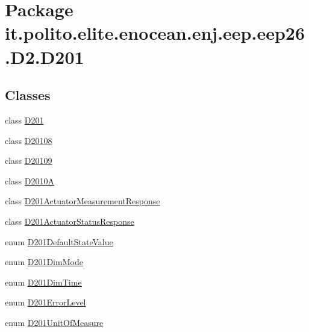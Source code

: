 \hypertarget{namespaceit_1_1polito_1_1elite_1_1enocean_1_1enj_1_1eep_1_1eep26_1_1_d2_1_1_d201}{}\section{Package it.\+polito.\+elite.\+enocean.\+enj.\+eep.\+eep26.\+D2.\+D201}
\label{namespaceit_1_1polito_1_1elite_1_1enocean_1_1enj_1_1eep_1_1eep26_1_1_d2_1_1_d201}
\subsection*{Classes}
\begin{DoxyCompactItemize}
\item 
class \hyperlink{classit_1_1polito_1_1elite_1_1enocean_1_1enj_1_1eep_1_1eep26_1_1_d2_1_1_d201_1_1_d201}{D201}
\item 
class \hyperlink{classit_1_1polito_1_1elite_1_1enocean_1_1enj_1_1eep_1_1eep26_1_1_d2_1_1_d201_1_1_d20108}{D20108}
\item 
class \hyperlink{classit_1_1polito_1_1elite_1_1enocean_1_1enj_1_1eep_1_1eep26_1_1_d2_1_1_d201_1_1_d20109}{D20109}
\item 
class \hyperlink{classit_1_1polito_1_1elite_1_1enocean_1_1enj_1_1eep_1_1eep26_1_1_d2_1_1_d201_1_1_d2010_a}{D2010A}
\item 
class \hyperlink{classit_1_1polito_1_1elite_1_1enocean_1_1enj_1_1eep_1_1eep26_1_1_d2_1_1_d201_1_1_d201_actuator_measurement_response}{D201\+Actuator\+Measurement\+Response}
\item 
class \hyperlink{classit_1_1polito_1_1elite_1_1enocean_1_1enj_1_1eep_1_1eep26_1_1_d2_1_1_d201_1_1_d201_actuator_status_response}{D201\+Actuator\+Status\+Response}
\item 
enum \hyperlink{enumit_1_1polito_1_1elite_1_1enocean_1_1enj_1_1eep_1_1eep26_1_1_d2_1_1_d201_1_1_d201_default_state_value}{D201\+Default\+State\+Value}
\item 
enum \hyperlink{enumit_1_1polito_1_1elite_1_1enocean_1_1enj_1_1eep_1_1eep26_1_1_d2_1_1_d201_1_1_d201_dim_mode}{D201\+Dim\+Mode}
\item 
enum \hyperlink{enumit_1_1polito_1_1elite_1_1enocean_1_1enj_1_1eep_1_1eep26_1_1_d2_1_1_d201_1_1_d201_dim_time}{D201\+Dim\+Time}
\item 
enum \hyperlink{enumit_1_1polito_1_1elite_1_1enocean_1_1enj_1_1eep_1_1eep26_1_1_d2_1_1_d201_1_1_d201_error_level}{D201\+Error\+Level}
\item 
enum \hyperlink{enumit_1_1polito_1_1elite_1_1enocean_1_1enj_1_1eep_1_1eep26_1_1_d2_1_1_d201_1_1_d201_unit_of_measure}{D201\+Unit\+Of\+Measure}
\end{DoxyCompactItemize}
